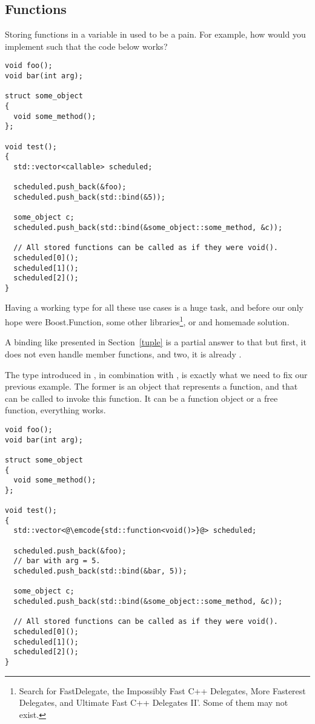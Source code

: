 \subsection{Functions}

Storing functions in a variable in \cpp{} used to be a pain. For
example, how would you implement  such that the code
below works?

\begin{lstlisting}
void foo();
void bar(int arg);

struct some_object
{
  void some_method();
};

void test();
{
  std::vector<callable> scheduled;

  scheduled.push_back(&foo);
  scheduled.push_back(std::bind(&5));

  some_object c;
  scheduled.push_back(std::bind(&some_object::some_method, &c));

  // All stored functions can be called as if they were void().
  scheduled[0]();
  scheduled[1]();
  scheduled[2]();
}
\end{lstlisting}

Having a working type for all these use cases is a huge task, and
before  our only hope were Boost.Function, some other
libraries\footnote{Search for FastDelegate, the Impossibly Fast C++
  Delegates, More Fasterest Delegates, and Ultimate Fast C++ Delegates
  II'. Some of them may not exist.}, or and homemade solution.

A binding like presented in Section~\ref{tuple} is a partial answer to
that but first, it does not even handle member functions, and two, it
is already .

\bigskip

The  type introduced in , in combination
with  , is exactly what we
need to fix our previous example. The former is an object that represents a
function, and that can be called to invoke this function. It can be a
function object or a free function, everything works.

\begin{lstlisting}
void foo();
void bar(int arg);

struct some_object
{
  void some_method();
};

void test();
{
  std::vector<@\emcode{std::function<void()>}@> scheduled;

  scheduled.push_back(&foo);
  // bar with arg = 5.
  scheduled.push_back(std::bind(&bar, 5));

  some_object c;
  scheduled.push_back(std::bind(&some_object::some_method, &c));

  // All stored functions can be called as if they were void().
  scheduled[0]();
  scheduled[1]();
  scheduled[2]();
}
\end{lstlisting}


